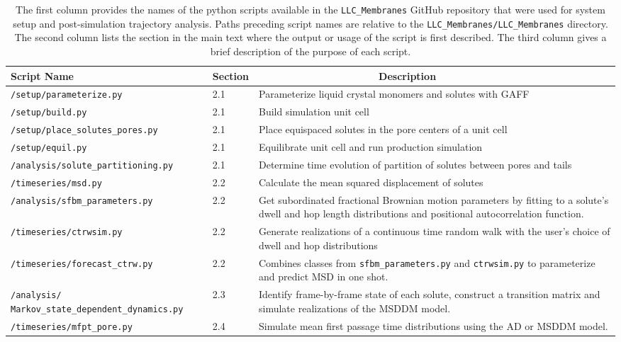 \documentclass{article}
\begin{document}
  \begin{table}[htb!]
  \centering
  \begin{tabular}{|A|B|C|}
  \hline
  \textbf{Script Name} & \textbf{Section} & ~~~~~~~~~~~~~~~~~~~~~\textbf{Description} \\
  \hline

  \texttt{/setup/parameterize.py}            & 2.1 & Parameterize liquid crystal monomers and solutes with GAFF \\ \hline
  \texttt{/setup/build.py}                   & 2.1 & Build simulation unit cell \\ \hline
  \texttt{/setup/place\_solutes\_pores.py}   & 2.1 & Place equispaced solutes in the pore centers of a unit cell \\\hline
  \texttt{/setup/equil.py}                   & 2.1 & Equilibrate unit cell and run production simulation \\\hline
  \texttt{/analysis/solute\_partitioning.py} & 2.1 & Determine time evolution of partition of solutes between pores and tails \\\hline
  \texttt{/timeseries/msd.py}                & 2.2 & Calculate the mean squared displacement of solutes \\\hline
  \texttt{/analysis/sfbm\_parameters.py}     & 2.2 & Get subordinated fractional Brownian motion parameters by fitting to a solute's dwell and hop length distributions and positional autocorrelation function. \\\hline
  \texttt{/timeseries/ctrwsim.py}            & 2.2 & Generate realizations of a continuous time random walk with the user's choice of dwell and hop distributions \\\hline
  \texttt{/timeseries/forecast\_ctrw.py}     & 2.2 & Combines classes from \texttt{sfbm\_parameters.py} and \texttt{ctrwsim.py} to parameterize and predict MSD in one shot. \\\hline
  \texttt{/analysis/ Markov\_state\_dependent\_dynamics.py} & 2.3 & Identify frame-by-frame state of each solute, construct a transition matrix and simulate realizations of the MSDDM model. \\\hline
  \texttt{/timeseries/mfpt\_pore.py}          & 2.4 & Simulate mean first passage time distributions using the AD or MSDDM model. \\\hline
  \end{tabular}

  \caption{The first column provides the names of the python scripts available in
  the \texttt{LLC\_Membranes} GitHub repository that were used for system setup and
  post-simulation trajectory analysis. Paths preceding script names are relative to the
  \texttt{LLC\_Membranes/LLC\_Membranes} directory. The second column lists the section in the main
  text where the output or usage of the script is first described. The third column
  gives a brief description of the purpose of each script.
  }~\label{table:python_scripts}

  \end{table}
  
\end{document}
